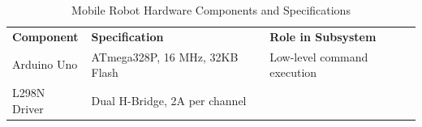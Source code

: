 \documentclass[12pt,a4paper,oneside]{report}
\begin{document}
\begin{longtable}[]{@{}
  >{\raggedright\arraybackslash}p{}
  >{\raggedright\arraybackslash}p{}
  >{\raggedright\arraybackslash}p{}@{}}
\caption{Mobile Robot Hardware Components and Specifications\label{tab:table8}}\\

\toprule\noalign{}
\begin{minipage}[b]{\linewidth}\raggedright

\textbf{Component}

\end{minipage} & \begin{minipage}[b]{\linewidth}\raggedright

\textbf{Specification}

\end{minipage} & \begin{minipage}[b]{\linewidth}\raggedright

\textbf{Role in Subsystem}

\end{minipage} \\
\begin{minipage}[b]{\linewidth}\raggedright

Arduino Uno

\end{minipage} & \begin{minipage}[b]{\linewidth}\raggedright

ATmega328P, 16 MHz, 32KB Flash

\end{minipage} & \begin{minipage}[b]{\linewidth}\raggedright

Low-level command execution

\end{minipage} \\
\begin{minipage}[b]{\linewidth}\raggedright

L298N Driver

\end{minipage} & \begin{minipage}[b]{\linewidth}\raggedright

Dual H-Bridge, 2A per channel

\end{minipage} & \begin{minipage}[b]{\linewidth}\raggedright


\end{minipage}
\end{longtable}
\end{document}
